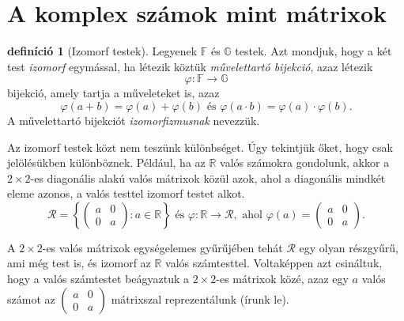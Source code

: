\documentclass[a4paper, showtrims]{memoir}
\theoremstyle{plain}
\theoremstyle{remark}
\theoremstyle{definition}
\newtheorem{definition}[proposition]{definíció}
\begin{document}
\section{A komplex számok mint mátrixok}
\begin{definition}[Izomorf testek]
	Legyenek $\mathbb{F}$ és $\mathbb{G}$ testek.
	Azt mondjuk, hogy a két test \emph{izomorf} egymással,
	ha létezik köztük \emph{művelettartó bijekció}, azaz létezik
	\[
		\varphi:\mathbb{F}\to\mathbb{G}
	\]
	bijekció, amely tartja a műveleteket is, azaz
	\[
		\varphi\left( a+b \right)=\varphi\left( a \right)+\varphi\left( b \right)
		\text{ és }
		\varphi\left( a\cdot b \right)=\varphi\left( a \right)\cdot \varphi\left( b \right).
	\]
	A művelettartó bijekciót \emph{izomorfizmusnak} nevezzük.
\end{definition}
Az izomorf testek közt nem teszünk különbséget. Úgy tekintjük őket, hogy csak jelölésükben különböznek.
Például, ha az $\mathbb{R}$ valós számokra gondolunk,
akkor a $2\times 2$-es diagonális alakú valós mátrixok közül azok, ahol a diagonális mindkét eleme azonos,
a valós testtel izomorf testet alkot.
\[
	\mathcal{R}=\left\{
	\begin{pmatrix}
		a & 0 \\
		0 & a
	\end{pmatrix}
	:a\in\mathbb{R}
	\right\}
	\text{ és }
	\varphi:\mathbb{R}\to\mathcal{R},
	\text{ ahol }
	\varphi\left( a \right)
	=
	\begin{pmatrix}
		a & 0 \\
		0 & a
	\end{pmatrix}.
\]

A $2\times 2$-es valós mátrixok egységelemes gyűrűjében tehát $\mathcal{R}$ egy olyan részgyűrű, ami még test is,
és izomorf az $\mathbb{R}$ valós számtesttel.
Voltaképpen azt csináltuk, hogy a valós számtestet beágyaztuk a $2\times 2$-es mátrixok közé,
azaz egy $a$ valós számot az
\begin{math}
	\begin{pmatrix}
		a & 0 \\
		0 & a
	\end{pmatrix}
\end{math}
mátrixszal reprezentálunk (írunk le).
\end{document}
